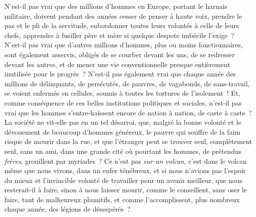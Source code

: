 \documentclass[french,twoside]{book} %
\begin{document}
N’est-il pas vrai que des millions d’hommes en Europe, portant le harnais militaire, doivent pendant des années cesser de penser à haute voix, prendre le pas et le pli de la servitude, subordonner toutes leurs volontés à celle de leurs chefs, apprendre à fusiller père et mère si quelque despote imbécile l’exige ? N’est-il pas vrai que d’autres  millions d’hommes, plus ou moins fonctionnaires, sont également asservis, obligés de se courber devant les uns, de se redresser devant les autres, et de mener une vie conventionnelle presque entièrement inutilisée pour le progrès ? N’est-il pas également vrai que chaque année des millions de délinquants, de persécutés, de pauvres, de vagabonds, de sans-travail, se voient enfermés en cellules, soumis à toutes les tortures de l’isolement ! Et, comme conséquence de ces belles institutions politiques et sociales, n’est-il pas vrai que les hommes s’entre-haïssent encore de nation à nation, de caste à caste ? La société ne vit-elle pas en un tel désarroi, que, malgré la bonne volonté et le dévouement de beaucoup d’hommes généreux, le pauvre  qui souffre de la faim risque de mourir dans la rue, et que l’étranger peut se trouver seul, complètement seul, sans un ami, dans une grande cité où pourtant les hommes, de prétendus \emph{frères}, grouillent par myriades ? Ce n’est pas \emph{sur un volcan}, c’est dans le volcan même que nous vivons, dans un enfer ténébreux, et si nous n’avions pas l’espoir du mieux et l’invincible volonté de travailler pour un avenir meilleur, que nous resterait-il à faire, sinon à nous laisser mourir, comme le conseillent, sans oser le faire, tant de malheureux plumitifs, et comme l’accomplissent, plus nombreux chaque année, des légions de désespérés ?\par
\end{document}
